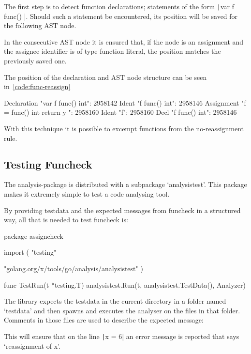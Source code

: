 The first step is to detect function declarations; statements of the form
\texttt|var f func() |. Should such a statement be encountered,
its position will be saved for the following AST node.

In the consecutive AST node it is ensured that, if the node is an assignment and
the assignee identifier is of type function literal, the position matches the
previously saved one.

The position of the declaration and AST node structure can be seen in~\ref{code:func-reassign}

\begin{code}
    \begin{gocode}
Declaration "var f func() int": 2958142
        Ident "f func() int": 2958146
Assignment "f = func() int { return y }": 2958160
        Ident "f": 2958160
                Decl "f func() int": 2958146
    \end{gocode}
    \label{code:func-reassign}
\end{code}
With this technique it is possible to excempt functions from the no-reassignment rule.

\subsection{Testing Funcheck}

The analysis-package is distributed with a subpackage `analysistest'. This package makes
it extremely simple to test a code analysing tool.

By providing testdata and the expected messages from funcheck in a structured way, all
that is needed to test funcheck is:

\begin{code}
\begin{gocode}
package assigncheck

import (
        "testing"

        "golang.org/x/tools/go/analysis/analysistest"
)

func TestRun(t *testing.T) {
        analysistest.Run(t, analysistest.TestData(), Analyzer)
}
\end{gocode}
\end{code}

The library expects the testdata in the current directory in a folder named `testdata' and
then spawns and executes the analyser on the files in that folder. Comments in those files
are used to describe the expected message:


This will ensure that on the line \texttt|x = 6| an error message is reported that says
`reassignment of x'.
